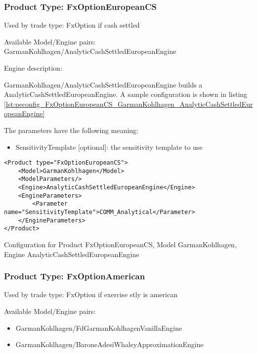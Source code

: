 \subsubsection{Product Type: FxOptionEuropeanCS}

Used by trade type: FxOption if cash settled

Available Model/Engine pairs: GarmanKohlhagen/AnalyticCashSettledEuropeanEngine

Engine description:

GarmanKohlhagen/AnalyticCashSettledEuropeanEngine builds a AnalyticCashSettledEuropeanEngine. A sample configuration is shown in listing
\ref{lst:peconfig_FxOptionEuropeanCS_GarmanKohlhagen_AnalyticCashSettledEuropeanEngine}

The parameters have the following meaning:

\begin{itemize}
\item SensitivityTemplate [optional]: the sensitivity template to use 
\end{itemize}

\begin{longlisting}
\begin{verbatim}
<Product type="FxOptionEuropeanCS">
    <Model>GarmanKohlhagen</Model>
    <ModelParameters/>
    <Engine>AnalyticCashSettledEuropeanEngine</Engine>
    <EngineParameters>
        <Parameter name="SensitivityTemplate">COMM_Analytical</Parameter>
    </EngineParameters>
</Product>
\end{verbatim}
\caption{Configuration for Product FxOptionEuropeanCS, Model GarmanKohlhagen, Engine AnalyticCashSettledEuropeanEngine}
\label{lst:peconfig_FxOptionEuropeanCS_GarmanKohlhagen_AnalyticCashSettledEuropeanEngine}
\end{longlisting}

\subsubsection{Product Type: FxOptionAmerican}

Used by trade type: FxOption if exercise stly is american

Available Model/Engine pairs:

\begin{itemize}
\item GarmanKohlhagen/FdGarmanKohlhagenVanillaEngine
\item GarmanKohlhagen/BaroneAdesiWhaleyApproximationEngine
\end{itemize}


